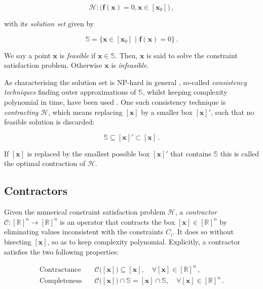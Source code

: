 \begin{equation}\label{eq:constraint_satisfaction_problem}
  \mathcal{H}: \big(\bm{f}(\bm{x}) = 0, \bm{x} \in [\bm{x}_0]\big)\,,
\end{equation}

\noindent
with its \emph{solution set} given by

\begin{equation}\label{eq:solution_set}
  \mathbb{S} = \big\{\bm{x} \in [\bm{x}_0] \,\,|\,\, \bm{f}(\bm{x}) = 0\big\}\,.
\end{equation}

\noindent
We say a point $\bm{x}$ is \emph{feasible} if $\bm{x} \in \mathbb{S}$. Then, $\bm{x}$ is said to solve the constraint satisfaction problem. Otherwise $\bm{x}$ is \emph{infeasible}.

As characterising the solution set is NP-hard in general \cite{jaulin2001applied}, so-called \emph{consistency techniques} finding outer approximations of $\mathbb{S}$, whilst keeping complexity polynomial in time, have been used \cite{744754, Sam-Haroud1996, Sam:31901}. One such consistency technique is \emph{contracting} $\mathcal{H}$, which means replacing $[\bm{x}]$ by a smaller box $[\bm{x}]'$, such that no feasible solution is discarded:

\begin{equation}
  \mathbb{S} \subseteq [\bm{x}]' \subset [\bm{x}]\,.
\end{equation}

\noindent
If $[\bm{x}]$ is replaced by the smallest possible box $[\bm{x}]'$ that contains $\mathbb{S}$ this is called the optimal contraction of $\mathcal{H}$. 


\subsection{Contractors}\label{sec:contractors}

Given the numerical constraint satisfaction problem $\mathcal{H}$, a \emph{contractor} $\mathcal{C}: [\mathbb{R}]^n \rightarrow [\mathbb{R}]^n$ is an operator that contracts the box $[\bm{x}] \in [\mathbb{R}]^n$ by eliminating values inconsistent with the constraints $C_i$. It does so without bisecting $[\bm{x}]$, so as to keep complexity polynomial. Explicitly, a contractor satisfies the two following properties:

 \begin{align}
  \mathrm{Contractance} &\quad \mathcal{C}\big([\bm{x}]\big) \subseteq [\bm{x}], \quad \forall [\bm{x}] \in [\mathbb{R}]^n\,, \\
  \mathrm{Completeness} &\quad \mathcal{C}\big([\bm{x}]\big) \cap \mathbb{S} = [\bm{x}] \cap \mathbb{S}, \quad \forall [\bm{x}] \in [\mathbb{R}]^n\,.
\end{align}


